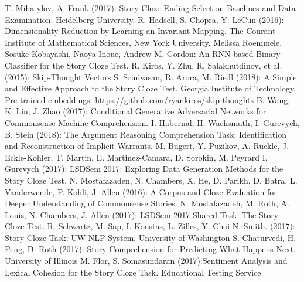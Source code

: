 \documentclass{article}
\begin{document}
\pagebreak
\begin{thebibliography}{}
T. Miha ylov, A. Frank (2017): Story Cloze Ending Selection Baselines and Data Examination. Heidelberg University.
 R. Hadsell, S. Chopra, Y. LeCun (2016): Dimensionality Reduction by Learning an Invariant Mapping. The Courant Institute of Mathematical Sciences,
New York University.
 Melissa Roemmele, Sosuke Kobayashi, Naoya Inoue, Andrew M. Gordon: An RNN-based Binary Classifier for the Story Cloze Test.
 R. Kiros, Y. Zhu, R. Salakhutdinov, et al. (2015): Skip-Thought Vectors
 S. Srinivasan, R. Arora, M. Riedl (2018): A Simple and Effective Approach to the Story Cloze Test. Georgia Institute of Technology.
 Pre-trained embeddings: https://github.com/ryankiros/skip-thoughts
 B. Wang, K. Liu, J. Zhao (2017): Conditional Generative Adversarial Networks for Commonsense Machine Comprehension.
 I. Habernal, H. Wachsmuth, I. Gurevych, B. Stein (2018): The Argument Reasoning Comprehension Task: Identification and Reconstruction of Implicit
Warrants.
 M. Bugert, Y. Puzikov, A. Ruckle, J. Eckle-Kohler, T. Martin, E. Martinez-Camara, D. Sorokin, M. Peyrard I. Gurevych (2017): LSDSem 2017: Exploring Data Generation Methods for the Story Cloze Test.
\bibitem{} N. Mostafazaden, N. Chambers, X. He, D. Parikh, D. Batra, L. Vanderwende, P. Kohli, J. Allen (2016): A Corpus and Cloze Evaluation for Deeper Understanding of Commonsense Stories.
 N. Mostafazadeh, M. Roth, A. Louis, N. Chambers, J. Allen (2017): LSDSem 2017 Shared Task: The Story Cloze Test.
 R. Schwartz, M. Sap, I. Konstas, L. Zilles, Y. Choi N. Smith. (2017): Story Cloze Task: UW NLP System. University of
Washington
S. Chaturvedi, H. Peng, D. Roth (2017): Story Comprehension for Predicting What Happens Next. University of Illinois
 M. Flor, S. Somasundaran (2017):Sentiment Analysis and Lexical Cohesion for the Story Cloze Task. Educational Testing Service



\end{thebibliography}
\end{document}
